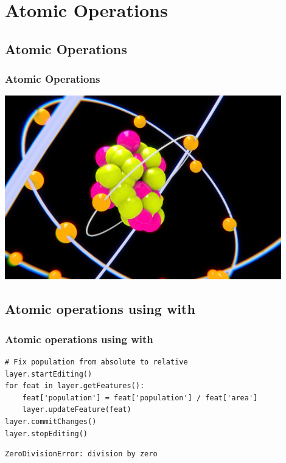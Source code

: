 \section{Atomic Operations}

\subsection{Atomic Operations}
\begin{frame}
\frametitle{Atomic Operations}
	\includegraphics[width=0.9\textwidth]{img/atom.jpg}
\end{frame}


\subsection{Atomic operations using with}
\begin{frame}[fragile]
\frametitle{Atomic operations using with}

\begin{lstlisting}[style=pythoncode]
# Fix population from absolute to relative
layer.startEditing()
for feat in layer.getFeatures():
	feat['population'] = feat['population'] / feat['area']
	layer.updateFeature(feat)
layer.commitChanges()
layer.stopEditing()
\end{lstlisting}
\pause
\begin{lstlisting}[style=pythonoutput]
ZeroDivisionError: division by zero
\end{lstlisting}

\end{frame}

